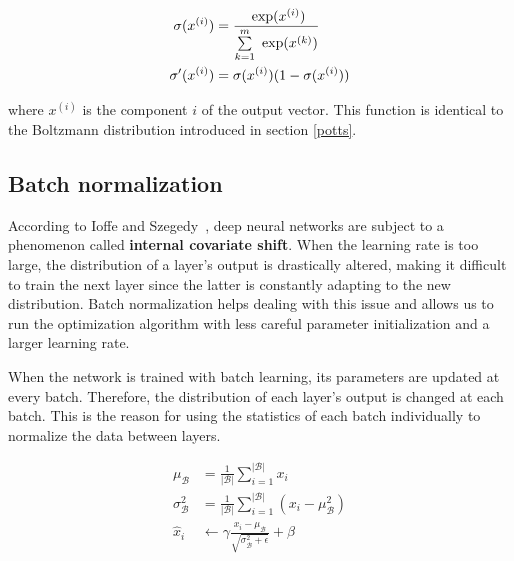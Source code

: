         \begin{equation}
            \begin{split}
                \sigma(x^{(i)}) & = \frac{\text{ exp}(x^{(i)})}{\sum\limits_{k=1}^m \text{ exp}(x^{(k)})} \\
                \sigma'(x^{(i)}) & = \sigma(x^{(i)}) (1 - \sigma(x^{(i)}))
            \end{split}
        \end{equation}

        where $x^{(i)}$ is the component $i$ of the output vector.  %
        This function is identical to the Boltzmann distribution introduced in section \ref{potts}.


    \subsection{Batch normalization} \label{batchnorm}

        According to Ioffe and Szegedy~\cite{DBLP:journals/corr/IoffeS15}, deep neural networks are subject to a phenomenon
        called \textbf{internal covariate shift}. When the learning rate is too large, the distribution of a layer's output
        is drastically altered, making it difficult to train the next layer since the latter is constantly adapting to the new
        distribution. Batch normalization helps dealing with this issue and allows us to run the optimization algorithm with less
        careful parameter initialization and a larger learning rate.

        When the network is trained with batch learning, its parameters are updated at every batch. Therefore, the distribution
        of each layer's output is changed at each batch. This is the reason for using the statistics of each batch individually
        to normalize the data between layers.


        \begin{equation}
            \begin{split}
                \mu_{\mathcal{B}} & = \frac{1}{\vert\mathcal{B}\vert} \sum\limits_{i=1}^{\vert\mathcal{B}\vert} x_i \\
                \sigma_{\mathcal{B}}^2 & = \frac{1}{\vert\mathcal{B}\vert} \sum\limits_{i=1}^{\vert\mathcal{B}\vert} (x_i - \mu_{\mathcal{B}}^2) \\
                \hat{x}_i & \leftarrow \gamma \frac{x_i - \mu_{\mathcal{B}}}{\sqrt{\sigma_{\mathcal{B}}^2 + \epsilon}} + \beta
            \end{split}
        \end{equation}

